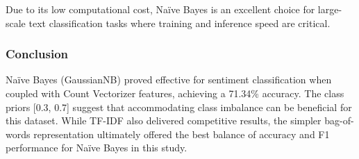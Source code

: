 Due to its low computational cost, Naïve Bayes is an excellent choice for large-scale text classification tasks where training and inference speed are critical.

\subsubsection{Conclusion}

Naïve Bayes (GaussianNB) proved effective for sentiment classification when coupled with Count Vectorizer features, achieving a 71.34\% accuracy. The class priors [0.3, 0.7] suggest that accommodating class imbalance can be beneficial for this dataset. While TF-IDF also delivered competitive results, the simpler bag-of-words representation ultimately offered the best balance of accuracy and F1 performance for Naïve Bayes in this study.

\newpage